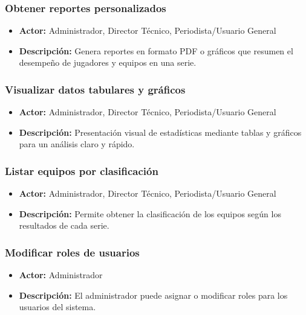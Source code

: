 \documentclass{report}
\begin{document}
\begin{enumerate}
            \subsubsection{Obtener reportes personalizados}
            \begin{itemize}
                \item \textbf{Actor:} Administrador, Director Técnico, Periodista/Usuario General
                \item \textbf{Descripción:} Genera reportes en formato PDF o gráficos que resumen el desempeño de jugadores y equipos en una serie.
            \end{itemize}

            \subsubsection{Visualizar datos tabulares y gráficos}
            \begin{itemize}
                \item \textbf{Actor:} Administrador, Director Técnico, Periodista/Usuario General
                \item \textbf{Descripción:} Presentación visual de estadísticas mediante tablas y gráficos para un análisis claro y rápido.
            \end{itemize}

            \subsubsection{Listar equipos por clasificación}
            \begin{itemize}
                \item \textbf{Actor:} Administrador, Director Técnico, Periodista/Usuario General
                \item \textbf{Descripción:} Permite obtener la clasificación de los equipos según los resultados de cada serie.
            \end{itemize}

            \subsubsection{Modificar roles de usuarios}
            \begin{itemize}
                \item \textbf{Actor:} Administrador
                \item \textbf{Descripción:} El administrador puede asignar o modificar roles para los usuarios del sistema.
            \end{itemize}


\end{enumerate}
\end{document}
